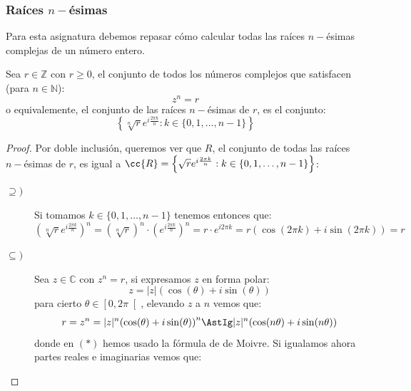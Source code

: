 \subsubsection{Raíces $n-$ésimas}
\noindent
Para esta asignatura debemos repasar cómo calcular todas las raíces $n-$ésimas complejas de un número entero.
\begin{prop}
    Sea $r\in \mathbb{Z}$ con $r\geq 0$, el conjunto de todos los números complejos que satisfacen (para $n\in \mathbb{N}$):
    \begin{equation*}
        z^n = r
    \end{equation*}
    o equivalemente, el conjunto de las raíces $n-$ésimas de $r$, es el conjunto:
    \begin{equation*}
        \left\{\sqrt[n]{r} e^{i \frac{2\pi k}{n}} : k \in \{0,1,\ldots,n-1\}\right\}
    \end{equation*}
    \begin{proof}
        Por doble inclusión, queremos ver que $R$, el conjunto de todas las raíces $n-$ésimas de $r$, es igual a $\cc{R} = \left\{\sqrt{r} e^{i \frac{2\pi k}{n}} : k \in \{0,1,\ldots,n-1\}\right\}$:
        \begin{description}
            \item [$\supseteq )$] Si tomamos $k \in \{0,1,\ldots,n-1\}$ tenemos entonces que:
                \begin{equation*}
                    {\left(\sqrt[n]{r}e^{i\frac{2\pi k}{n}}\right)}^{n} = {\left(\sqrt[n]{r}\right)}^{n} \cdot {\left(e^{i\frac{2\pi k}{n}}\right)}^{n} = r\cdot e^{i 2\pi k} = r(\cos(2\pi k) + i\sin(2\pi k)) = r
                \end{equation*}
            \item [$\subseteq )$] Sea $z\in \mathbb{C}$ con $z^n = r$, si expresamos $z$ en forma polar:
                \begin{equation*}
                    z = |z|(\cos(\theta) + i\sin(\theta))
                \end{equation*}
                para cierto $\theta\in \left[0,2\pi\right[$, elevando $z$ a $n$ vemos que:
                \begin{equation*}
                    r = z^n = |z|^n {(\cos(\theta) + i\sin(\theta))}^{n} \AstIg |z|^n (\cos(n\theta) + i\sin(n\theta))
                \end{equation*}
                donde en $(\ast)$ hemos usado la fórmula de de Moivre. Si igualamos ahora partes reales e imaginarias vemos que:
                \begin{equation*}

\end{equation*}
\end{description}
\end{proof}
\end{prop}
